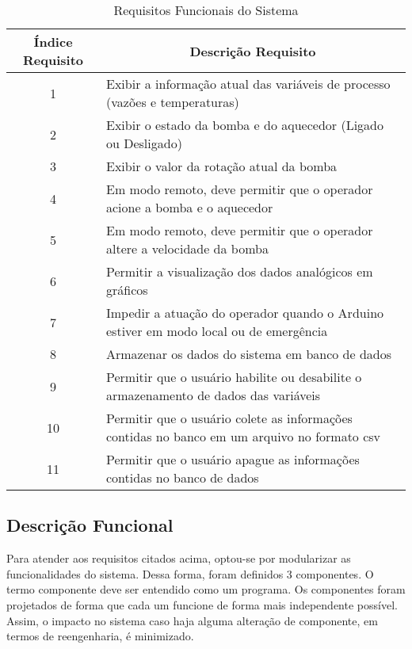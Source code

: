 		\begin{table}[!htb]
			\centering
			\caption{Requisitos Funcionais do Sistema}
			\label{tbl:requisitos}
			\def\arraystretch{1.3}
			\begin{tabular}{c p{11cm}}
				\hline
				\multicolumn{1}{c}{\textbf{Índice Requisito}} & \multicolumn{1}{c}{\textbf{Descrição Requisito}} \\ \hline 
				1 & Exibir a informação atual das variáveis de processo (vazões e temperaturas) \\ %
				2 & Exibir o estado da bomba e do aquecedor (Ligado ou Desligado) \\ %
				3 & Exibir o valor da rotação atual da bomba \\ %
				4 & Em modo remoto, deve permitir que o operador acione a bomba e o aquecedor \\ %
				5 & Em modo remoto, deve permitir que o operador altere a velocidade da bomba \\ %
				6 & Permitir a visualização dos dados analógicos em gráficos \\ %
				7 & Impedir a atuação do operador quando o Arduino estiver em modo local ou de emergência \\ %
				8 & Armazenar os dados do sistema em banco de dados \\ %
				9 & Permitir que o usuário habilite ou desabilite o armazenamento de dados das variáveis \\ %
				10 & Permitir que o usuário colete as informações contidas no banco em um arquivo no formato csv \\ %
				11 & Permitir que o usuário apague as informações contidas no banco de dados \\ \hline
			\end{tabular}
		\end{table}
		
		\subsection{Descrição Funcional}
			Para atender aos requisitos citados acima, optou-se por modularizar as funcionalidades do sistema. Dessa forma, foram definidos 3 componentes. O termo componente deve ser entendido como um programa. Os componentes foram projetados de forma que cada um funcione de forma mais independente possível. Assim, o impacto no sistema caso haja alguma alteração de componente, em termos de reengenharia, é minimizado.
			
